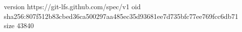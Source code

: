 version https://git-lfs.github.com/spec/v1
oid sha256:807f512b83cbed36ca500297aa485ec35d93681ee7d735bfc77ee769fcc6db71
size 43840
